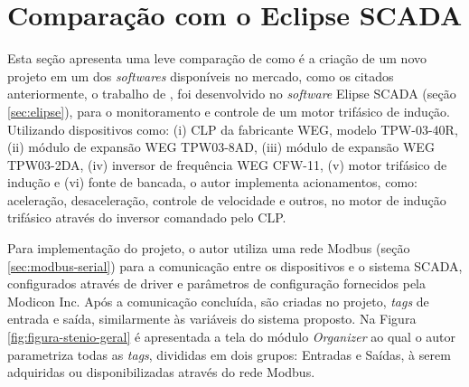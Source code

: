         \begin{figure}[!h]
    	\end{figure}
    	
\section{Comparação com o Eclipse SCADA}
\label{sec:comparacao-eclipse}

Esta seção apresenta uma leve comparação de como é a criação de um novo projeto em um dos \textit{softwares} disponíveis no mercado, como os citados anteriormente, o trabalho de  , foi desenvolvido no \textit{software} Elipse SCADA (seção \ref{sec:elipse}), para o monitoramento e controle de um motor trifásico de indução. Utilizando dispositivos como: (i) \gls{CLP} da fabricante WEG, modelo TPW-03-40R, (ii) módulo de expansão WEG TPW03-8AD, (iii) módulo de expansão WEG TPW03-2DA, (iv) inversor de frequência WEG CFW-11, (v) motor trifásico de indução e (vi) fonte de bancada, o autor implementa acionamentos, como: aceleração, desaceleração, controle de velocidade e outros, no motor de indução trifásico através do inversor comandado pelo \gls{CLP}.

Para implementação do projeto, o autor utiliza uma rede Modbus (seção \ref{sec:modbus-serial}) para a comunicação entre os dispositivos e o sistema \gls{SCADA}, configurados através de driver e parâmetros de configuração fornecidos pela Modicon Inc. Após a comunicação concluída, são criadas no projeto, \textit{tags} de entrada e saída, similarmente às variáveis do sistema proposto. Na Figura \ref{fig:figura-stenio-geral} é apresentada a tela do módulo \textit{Organizer} ao qual o autor parametriza todas as \textit{tags}, divididas em dois grupos: Entradas e Saídas, à serem adquiridas ou disponibilizadas através do rede Modbus.

